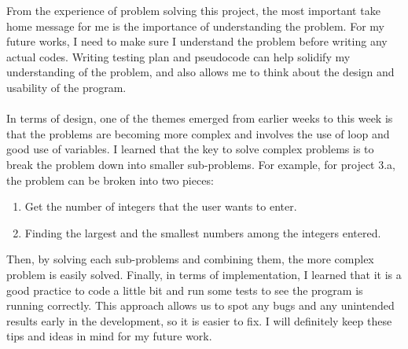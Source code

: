 \documentclass[11pt]{article}
\newenvironment{exercise}[2]{\begin{trivlist}
\item[\hskip \labelsep {\bfseries #1}\hskip \labelsep {\bfseries #2.}]}{\end{trivlist}}
\begin{document}
\begin{exercise}{Improvement}\\
    From the experience of problem solving this project, the most important
    take home message for me is the importance of understanding the problem.
    For my future works, I need to make sure I understand the problem before
    writing any actual codes. Writing testing plan and pseudocode can help
    solidify my understanding of the problem, and also allows me to think
    about the design and usability of the program.\\
    \\
    In terms of design, one of the themes emerged from earlier weeks to this
    week is that the problems are becoming more complex and involves the use of
    loop and good use of variables. I learned that the key to solve complex
    problems is to break the problem down into smaller sub-problems.
    For example, for project 3.a, the problem can be broken into two pieces:
\begin{enumerate}
  \item Get the number of integers that the user wants to enter.
  \item Finding the largest and the smallest numbers among the integers
  entered.
\end{enumerate}
    Then, by solving each sub-problems and combining them, the more complex
    problem is easily solved. Finally, in terms of implementation, I learned
    that it is a good practice to code a little bit and run some tests to see
    the program is running correctly. This approach allows us to spot any bugs
    and any unintended results early in the development, so it is easier to fix.
    I will definitely keep these tips and ideas in mind for my future work.




\end{exercise}

\end{document}
